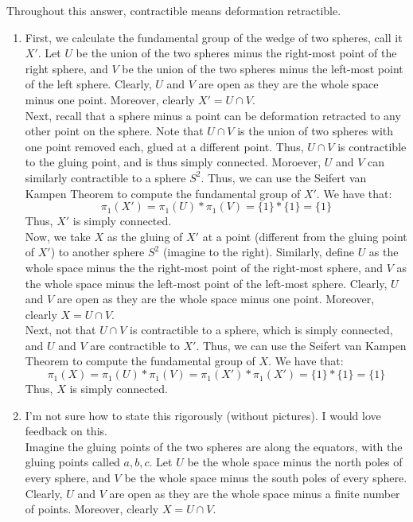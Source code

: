 \documentclass[12pt]{article}
\begin{document}
\begin{solution}
    Throughout this answer, contractible means deformation retractible. 
    \begin{enumerate}
        \item First, we calculate the fundamental group of the wedge of two spheres, call it $X'$. Let $U$ be the union of the two spheres minus the right-most point of the right sphere, and $V$ be the union of the two spheres minus the left-most point of the left sphere. Clearly, $U$ and $V$ are open as they are the whole space minus one point. Moreover, clearly $X' = U \cap V$. \\ 
        Next, recall that a sphere minus a point can be deformation retracted to any other point on the sphere. Note that $U \cap V$ is the union of two spheres with one point removed each, glued at a different point. Thus, $U \cap V$ is contractible to the gluing point, and is thus simply connected. Moroever, $U$ and $V$ can similarly contractible to a sphere $S^2$. Thus, we can use the Seifert van Kampen Theorem to compute the fundamental group of $X'$. We have that: 
        \[  \pi_1(X') = \pi_1(U) * \pi_1(V) = \{1\} * \{1\} = \{1\}\]
        Thus, $X'$ is simply connected. \\
        Now, we take $X$ as the gluing of $X'$ at a point (different from the gluing point of $X'$) to another sphere $S^2$ (imagine to the right). Similarly, define $U$ as the whole space minus the the right-most point of the right-most sphere, and $V$ as the whole space minus the left-most point of the left-most sphere. Clearly, $U$ and $V$ are open as they are the whole space minus one point. Moreover, clearly $X = U \cap V$. \\
        Next, not that $U \cap V$ is contractible to a sphere, which is simply connected, and $U$ and $V$ are contractible to $X'$. Thus, we can use the Seifert van Kampen Theorem to compute the fundamental group of $X$. We have that:
        \[  \pi_1(X) = \pi_1(U) * \pi_1(V) = \pi_1(X') * \pi_1(X') = \{1\} * \{1\} = \{1\}\]
        Thus, $X$ is simply connected.
        \item I'm not sure how to state this rigorously (without pictures). I would love feedback on this. \\
        Imagine the gluing points of the two spheres are along the equators, with the gluing points called $a, b, c$. Let $U$ be the whole space minus the north poles of every sphere, and $V$ be the whole space minus the south poles of every sphere. Clearly, $U$ and $V$ are open as they are the whole space minus a finite number of points. Moreover, clearly $X = U \cap V$. \bbni

\end{enumerate}
\end{solution}
\end{document}

